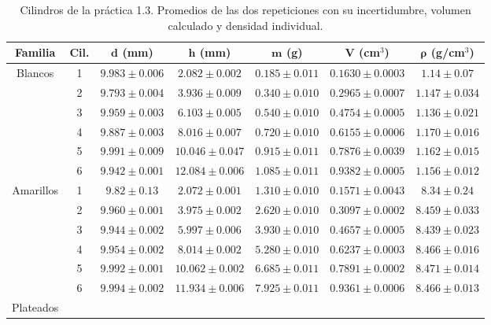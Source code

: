 \begin{table}[!htb]
    \centering
    \small
    \caption{Cilindros de la práctica 1.3. Promedios de las dos repeticiones con su incertidumbre, volumen calculado y densidad individual.}
    \label{tab:p13}
    \begin{tabular}{c c c c c c c}
        \toprule
        \textbf{Familia} & \textbf{Cil.} & $\bm{d}$ (mm) & $\bm{h}$ (mm) & $\bm{m}$ (g) & $\bm{V}$ (cm$^{3}$) & $\bm{\rho}$ (g/cm$^{3}$) \\
        \midrule
        \multirow{6}{*}{Blancos}
          & 1 & $9.983 \pm 0.006$  & $2.082 \pm 0.002$  & $0.185 \pm 0.011$ & $0.1630 \pm 0.0003$ & $1.14 \pm 0.07$ \\
          & 2 & $9.793 \pm 0.004$  & $3.936 \pm 0.009$  & $0.340 \pm 0.010$ & $0.2965 \pm 0.0007$ & $1.147 \pm 0.034$ \\
          & 3 & $9.959 \pm 0.003$  & $6.103 \pm 0.005$  & $0.540 \pm 0.010$ & $0.4754 \pm 0.0005$ & $1.136 \pm 0.021$ \\
          & 4 & $9.887 \pm 0.003$  & $8.016 \pm 0.007$  & $0.720 \pm 0.010$ & $0.6155 \pm 0.0006$ & $1.170 \pm 0.016$ \\
          & 5 & $9.991 \pm 0.009$  & $10.046 \pm 0.047$ & $0.915 \pm 0.011$ & $0.7876 \pm 0.0039$ & $1.162 \pm 0.015$ \\
          & 6 & $9.942 \pm 0.001$  & $12.084 \pm 0.006$ & $1.085 \pm 0.011$ & $0.9382 \pm 0.0005$ & $1.156 \pm 0.012$ \\
        \midrule
        \multirow{6}{*}{Amarillos}
          & 1 & $9.82 \pm 0.13$    & $2.072 \pm 0.001$  & $1.310 \pm 0.010$ & $0.1571 \pm 0.0043$ & $8.34 \pm 0.24$ \\
          & 2 & $9.960 \pm 0.001$  & $3.975 \pm 0.002$  & $2.620 \pm 0.010$ & $0.3097 \pm 0.0002$ & $8.459 \pm 0.033$ \\
          & 3 & $9.944 \pm 0.002$  & $5.997 \pm 0.006$  & $3.930 \pm 0.010$ & $0.4657 \pm 0.0005$ & $8.439 \pm 0.023$ \\
          & 4 & $9.954 \pm 0.002$  & $8.014 \pm 0.002$  & $5.280 \pm 0.010$ & $0.6237 \pm 0.0003$ & $8.466 \pm 0.016$ \\
          & 5 & $9.992 \pm 0.001$  & $10.062 \pm 0.002$ & $6.685 \pm 0.011$ & $0.7891 \pm 0.0002$ & $8.471 \pm 0.014$ \\
          & 6 & $9.994 \pm 0.002$  & $11.934 \pm 0.006$ & $7.925 \pm 0.011$ & $0.9361 \pm 0.0006$ & $8.466 \pm 0.013$ \\
        \midrule
        \multirow{6}{*}{Plateados}

\end{tabular}
\end{table}
